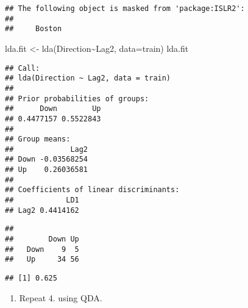 \documentclass[
]{article}
\newenvironment{Shaded}{\begin{snugshade}}{\end{snugshade}}
\newcommand{\AttributeTok}[1]{\textcolor[rgb]{0.77,0.63,0.00}{#1}}
\newcommand{\FunctionTok}[1]{\textcolor[rgb]{0.00,0.00,0.00}{#1}}
\newcommand{\NormalTok}[1]{#1}
\newcommand{\OtherTok}[1]{\textcolor[rgb]{0.56,0.35,0.01}{#1}}
\newcommand{\SpecialCharTok}[1]{\textcolor[rgb]{0.00,0.00,0.00}{#1}}
\newcommand{\StringTok}[1]{\textcolor[rgb]{0.31,0.60,0.02}{#1}}
\providecommand{\tightlist}{%
  \setlength{\itemsep}{0pt}\setlength{\parskip}{0pt}}
\begin{document}
\begin{verbatim}
## The following object is masked from 'package:ISLR2':
## 
##     Boston
\end{verbatim}

\begin{Shaded}
\begin{Highlighting}[]
\NormalTok{lda.fit }\OtherTok{\textless{}{-}} \FunctionTok{lda}\NormalTok{(Direction}\SpecialCharTok{\textasciitilde{}}\NormalTok{Lag2,}
              \AttributeTok{data=}\NormalTok{train)}
\NormalTok{lda.fit}
\end{Highlighting}
\end{Shaded}

\begin{verbatim}
## Call:
## lda(Direction ~ Lag2, data = train)
## 
## Prior probabilities of groups:
##      Down        Up 
## 0.4477157 0.5522843 
## 
## Group means:
##             Lag2
## Down -0.03568254
## Up    0.26036581
## 
## Coefficients of linear discriminants:
##            LD1
## Lag2 0.4414162
\end{verbatim}

\begin{Shaded}
\end{Shaded}

\begin{verbatim}
##       
##        Down Up
##   Down    9  5
##   Up     34 56
\end{verbatim}

\begin{Shaded}
\end{Shaded}

\begin{verbatim}
## [1] 0.625
\end{verbatim}

\begin{enumerate}
\def\labelenumi{\arabic{enumi}.}
\setcounter{enumi}{5}
\tightlist
\item
  Repeat 4. using QDA.
\end{enumerate}
\end{document}
